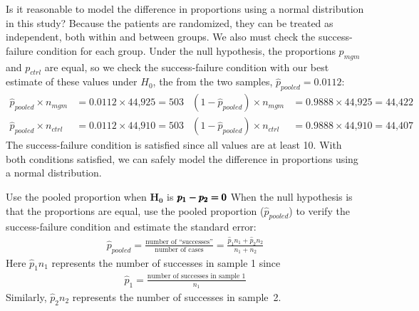 \begin{examplewrap}
\begin{nexample}{Is it reasonable to model the difference
    in proportions using a normal distribution in this
    study?}
  \label{condFormammogramStudySummaryTableNormalInference}%
  Because the patients are randomized, they can be treated
  as independent, both within and between groups.
  We also must check the success-failure condition for each group.
  Under the null hypothesis, the proportions $p_{mgm}$
  and $p_{ctrl}$ are equal, so we check the success-failure
  condition with our best estimate of these values under $H_0$,
  the  from the two samples,
  $\hat{p}_{\textit{pooled}} = 0.0112$:
  \begin{align*}
  \hat{p}_{\textit{pooled}} \times n_{mgm}
      &= 0.0112 \times \text{44,925} = 503
    & (1 - \hat{p}_{\textit{pooled}}) \times n_{mgm}
      &= 0.9888 \times \text{44,925} = \text{44,422} \\
  \hat{p}_{\textit{pooled}} \times n_{ctrl}
      &= 0.0112 \times \text{44,910} = 503
    & (1 - \hat{p}_{\textit{pooled}}) \times n_{ctrl}
      &= 0.9888 \times \text{44,910} = \text{44,407}
  \end{align*}
  The success-failure condition is satisfied since
  all values are at least 10.
  With both conditions satisfied, we can safely model
  the difference in proportions using a normal
  distribution.
\end{nexample}
\end{examplewrap}

\begin{onebox}{Use the pooled proportion when
    $\pmb{H_0}$ is $\pmb{\MakeLowercase{p_1 - p_2 = 0}}$}
  When the null hypothesis is that the proportions are equal,
  use the pooled proportion ($\hat{p}_{\textit{pooled}}$)
  to verify the
  success-failure condition and estimate the standard error:
  \begin{eqnarray*}
  \hat{p}_{\textit{pooled}}
    = \frac{\text{number of ``successes''}}
      {\text{number of cases}}
    = \frac{\hat{p}_1 n_1 + \hat{p}_2 n_2}{n_1 + n_2}
  \end{eqnarray*}
  Here $\hat{p}_1 n_1$ represents the number of successes in
  sample 1 since
  \begin{eqnarray*}
  \hat{p}_1
    = \frac{\text{number of successes in sample 1}}{n_1}
  \end{eqnarray*}
  Similarly, $\hat{p}_2 n_2$ represents the number
  of successes in sample~2.
\end{onebox}

